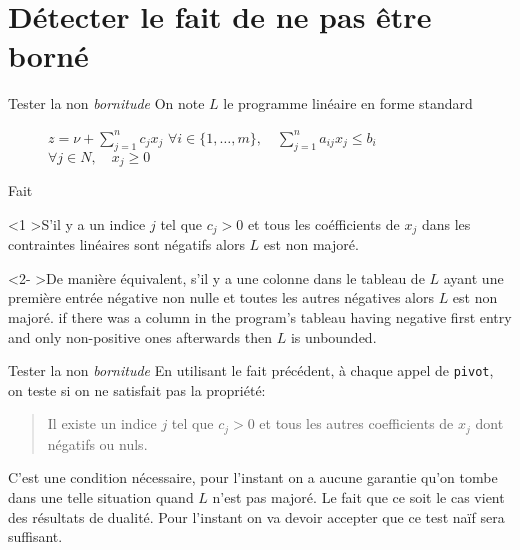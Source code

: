 \documentclass[aspectratio = 169]{beamer}
\begin{document}
\section{Détecter le fait de ne pas être borné}

\begin{frame}{Tester la non \emph{bornitude}}
  On note $L$ le programme linéaire en forme standard
  \begin{figure}
    \begin{linearProgG}{
        ${\displaystyle z = \nu + \sum_{j=1}^n c_jx_j}$
      }{
        ${\displaystyle \forall i \in \{1, \ldots, m\}, \quad \sum_{j=1}^n a_{ij}x_j \leq b_i}$
      }{
        $\forall j \in N, \quad x_j \geq 0$
      }
    \end{linearProgG}
  \end{figure}
  \begin{halfshyblock}{Fait}
    \begin{onlyenv}<1
      >S'il y a un indice $j$ tel que $c_j > 0$ et
      tous les coéfficients de $x_j$ dans les contraintes linéaires
      sont négatifs alors $L$ est non majoré.
    \end{onlyenv}
    \begin{onlyenv}<2-
      >\!\alert{De manière équivalent, s'il y a une
        colonne dans le tableau de $L$ ayant une première entrée
        négative non nulle et toutes les autres négatives alors $L$
        est non majoré. if there was a column in the program's tableau
        having negative first entry and only non-positive ones
        afterwards then $L$ is unbounded.}
    \end{onlyenv}
    \end{halfshyblock}
\end{frame}

\begin{frame}{Tester la non \emph{bornitude}}
  En utilisant le fait précédent, à chaque appel de
  \texttt{pivot}, on teste si on ne satisfait pas la
  propriété:
  \begin{quote}
    Il existe un indice $j$ tel que $c_j > 0$ et tous les autres
    coefficients de $x_j$ dont négatifs ou nuls.
    \end{quote}
    \pause
    C'est une condition nécessaire, pour l'instant on a aucune
    garantie qu'on tombe dans une telle situation quand $L$ n'est pas
    majoré. Le fait que ce soit le cas vient des résultats de dualité.
    \pause
    Pour l'instant on va devoir accepter que ce test naïf sera
    suffisant.
\end{frame}
\end{document}

